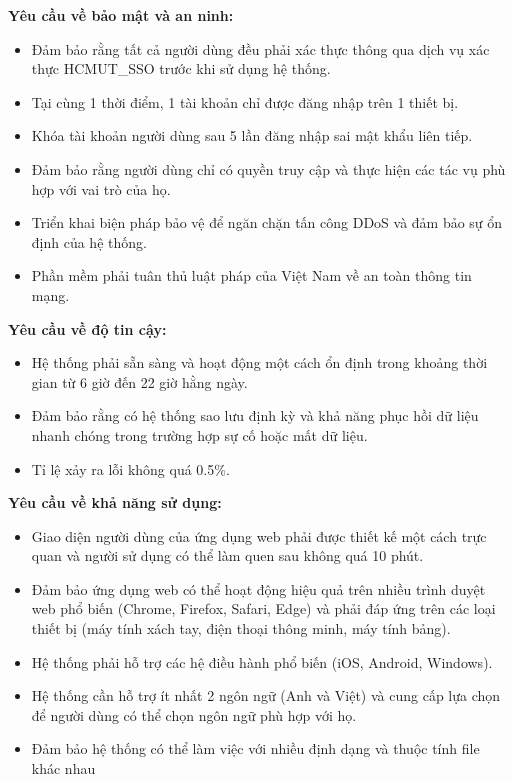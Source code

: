         \textbf{Yêu cầu về bảo mật và an ninh:}
            \begin{itemize}
                \item Đảm bảo rằng tất cả người dùng đều phải xác thực thông qua dịch vụ xác thực HCMUT\_SSO trước khi sử dụng hệ thống.
                \item Tại cùng 1 thời điểm, 1 tài khoản chỉ được đăng nhập trên 1 thiết bị.
                \item Khóa tài khoản người dùng sau 5 lần đăng nhập sai mật khẩu liên tiếp.
                \item Đảm bảo rằng người dùng chỉ có quyền truy cập và thực hiện các tác vụ phù hợp với vai trò của họ.
                \item Triển khai biện pháp bảo vệ để ngăn chặn tấn công DDoS và đảm bảo sự ổn định của hệ thống.
                \item Phần mềm phải tuân thủ luật pháp của Việt Nam về an toàn thông tin mạng.
            \end{itemize}
            
        \textbf{Yêu cầu về độ tin cậy:}
            \begin{itemize}
                \item Hệ thống phải sẵn sàng và hoạt động một cách ổn định trong khoảng thời gian từ 6 giờ đến 22 giờ hằng ngày.
                \item Đảm bảo rằng có hệ thống sao lưu định kỳ và khả năng phục hồi dữ liệu nhanh chóng trong trường hợp sự cố hoặc mất dữ liệu.
                \item Tỉ lệ xảy ra lỗi không quá 0.5\%.
            \end{itemize}

        \textbf{Yêu cầu về khả năng sử dụng:}
                \begin{itemize}
                \item Giao diện người dùng của ứng dụng web phải được thiết kế một cách trực quan và người sử dụng có thể làm quen sau không quá 10 phút.
                \item Đảm bảo ứng dụng web có thể hoạt động hiệu quả trên nhiều trình duyệt web phổ biến (Chrome, Firefox, Safari, Edge) và phải đáp ứng trên các loại thiết bị (máy tính xách tay, điện thoại thông minh, máy tính bảng).
                \item Hệ thống phải hỗ trợ các hệ điều hành phổ biến (iOS, Android, Windows).
                \item Hệ thống cần hỗ trợ ít nhất 2 ngôn ngữ (Anh và Việt) và cung cấp lựa chọn để người dùng có thể chọn ngôn ngữ phù hợp với họ.
                \item Đảm bảo hệ thống có thể làm việc với nhiều định dạng và thuộc tính file khác nhau
                \end{itemize} 
                
